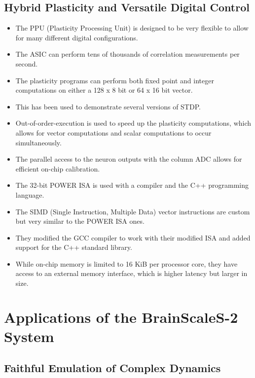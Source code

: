 \documentclass[12pt, letterpaper]{article}
\begin{document}
\subsection*{Hybrid Plasticity and Versatile Digital Control}
\begin{itemize}
    \item The PPU (Plasticity Processing Unit) is designed to be very flexible to allow for many different digital configurations.
    \item The ASIC can perform tens of thousands of correlation measurements per second.
    \item The plasticity programs can perform both fixed point and integer computations on either a 128 x 8 bit or 64 x 16 bit vector.
    \item This has been used to demonstrate several versions of STDP. 
    \item Out-of-order-execution is used to speed up the plasticity computations, which allows for vector computations and scalar computations to occur simultaneously.
    \item The parallel access to the neuron outputs with the column ADC allows for efficient on-chip calibration.
    \item The 32-bit POWER ISA is used with a compiler and the C++ programming language.
    \item The SIMD (Single Instruction, Multiple Data) vector instructions are custom but very similar to the POWER ISA ones.
    \item They modified the GCC compiler to work with their modified ISA and added support for the C++ standard library.
    \item While on-chip memory is limited to 16 KiB per processor core, they have access to an external memory interface, which is higher latency but larger in size.
\end{itemize}

\section*{Applications of the BrainScaleS-2 System}

\subsection*{Faithful Emulation of Complex Dynamics}
\end{document}

